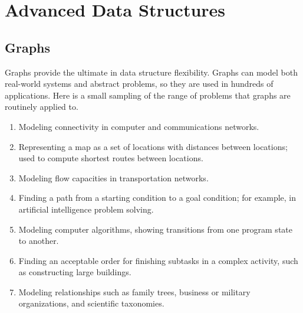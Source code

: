 
\part{Advanced Data Structures}
\label{AdvancedDS}
\mycleardoublepage

\chapter{Graphs}
\label{Graphs}
\def\CHHEAD{Chap.\ \thechapter\ Graphs}    %
Graphs provide the ultimate in data structure flexibility.
Graphs can model both real-world systems and abstract problems,
so they are used in hundreds of applications.
Here is a small sampling of the range of problems that graphs are
routinely applied to.

\begin{enumerate}

\item
Modeling connectivity in computer and communications networks.

\item
Representing a map as a set of locations with distances between
locations; used to compute shortest routes between locations.

\item
Modeling flow capacities in transportation networks.

\item
Finding a path from a starting condition to a goal condition;
for example, in artificial intelligence problem solving.

\item
Modeling computer algorithms, showing transitions from one program
state to another.

\item
Finding an acceptable order for finishing subtasks in a complex
activity, such as constructing large buildings.

\item
Modeling relationships such as family trees, business or military
organizations, and scientific taxonomies.

\end{enumerate}

